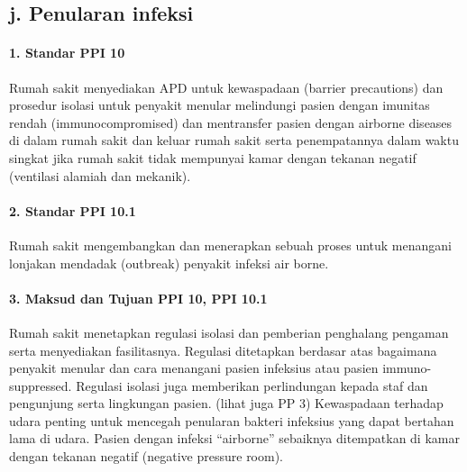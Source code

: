 \documentclass[
]{book}
\begin{document}
\hypertarget{j.-penularan-infeksi}{%
\subsection*{j. Penularan infeksi}\label{j.-penularan-infeksi}}

\hypertarget{standar-ppi-10}{%
\paragraph*{1. Standar PPI 10}\label{standar-ppi-10}}

Rumah sakit menyediakan APD untuk kewaspadaan (barrier precautions) dan prosedur isolasi untuk penyakit menular melindungi pasien dengan imunitas rendah (immunocompromised) dan mentransfer pasien dengan airborne diseases di dalam rumah sakit dan keluar rumah sakit serta penempatannya dalam waktu singkat jika rumah sakit tidak mempunyai kamar dengan tekanan negatif (ventilasi alamiah dan mekanik).

\hypertarget{standar-ppi-10.1}{%
\paragraph*{2. Standar PPI 10.1}\label{standar-ppi-10.1}}

Rumah sakit mengembangkan dan menerapkan sebuah proses untuk menangani lonjakan mendadak (outbreak) penyakit infeksi air borne.

\hypertarget{maksud-dan-tujuan-ppi-10-ppi-10.1}{%
\paragraph*{3. Maksud dan Tujuan PPI 10, PPI 10.1}\label{maksud-dan-tujuan-ppi-10-ppi-10.1}}

Rumah sakit menetapkan regulasi isolasi dan pemberian penghalang pengaman serta menyediakan fasilitasnya. Regulasi ditetapkan berdasar atas bagaimana penyakit menular dan cara menangani pasien infeksius atau pasien immuno-suppressed. Regulasi isolasi juga memberikan perlindungan kepada staf dan pengunjung serta lingkungan pasien. (lihat juga PP 3) Kewaspadaan terhadap udara penting untuk mencegah penularan bakteri infeksius yang dapat bertahan lama di udara. Pasien dengan infeksi ``airborne'' sebaiknya ditempatkan di kamar dengan tekanan negatif (negative pressure room).
\end{document}
